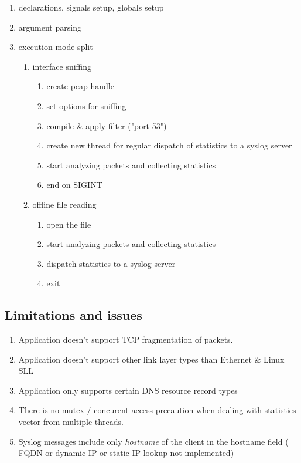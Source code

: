 \begin{enumerate}
\item declarations, signals setup, globals setup
\item argument parsing
\item execution mode split
\begin{enumerate}[label=(\alph*)]
\item interface sniffing
\begin{enumerate}
\item create pcap handle
\item set options for sniffing
\item compile \& apply filter ("port 53")
\item create new thread for regular dispatch of statistics to a syslog server
\item start analyzing packets and collecting statistics
\item end on SIGINT
\end{enumerate}
\item offline file reading
\begin{enumerate}
\item open the file
\item start analyzing packets and collecting statistics
\item dispatch statistics to a syslog server
\item exit
\end{enumerate}
\end{enumerate}

\end{enumerate}

\subsection{Limitations and issues}

\begin{enumerate}
\item Application doesn't support TCP fragmentation of packets.
\item Application doesn't support other link layer types than Ethernet \& Linux SLL
\item Application only supports certain DNS resource record types
\item There is no mutex / concurent access precaution when dealing with statistics vector from multiple threads.
\item Syslog messages include only \textit{hostname} of the client in the hostname field ( FQDN or dynamic IP or static IP lookup not implemented)
\end{enumerate}